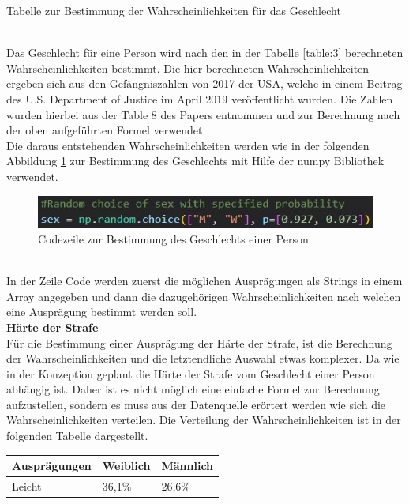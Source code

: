 \begin{onehalfspace}
\begin{table}[!h]
\caption{Tabelle zur Bestimmung der Wahrscheinlichkeiten für das Geschlecht}
\label{table:3}
\end{table}\\
Das Geschlecht für eine Person wird nach den in der Tabelle \ref{table:3} berechneten Wahrscheinlichkeiten bestimmt. Die hier berechneten Wahrscheinlichkeiten ergeben sich aus den Gefängniszahlen von 2017 der USA, welche in einem Beitrag des U.S. Department of Justice im April 2019 veröffentlicht wurden. Die Zahlen wurden hierbei aus der \glqq{}Table 8\grqq{} des Papers entnommen und zur Berechnung nach der oben aufgeführten Formel verwendet.\cite[S. 17]{Bronson2017}\\
Die daraus entstehenden Wahrscheinlichkeiten werden wie in der folgenden Abbildung \ref{fig:GeschlechtscodeS1} zur Bestimmung des Geschlechts mit Hilfe der \glqq{}numpy\grqq{} Bibliothek verwendet.
\begin{figure}[h]
    \centering
    \includegraphics{Diagramme/Sz1_GeschlechtsCode.JPG}
    \caption{Codezeile zur Bestimmung des Geschlechts einer Person}
    \label{fig:GeschlechtscodeS1}
\end{figure}\\
In der Zeile Code werden zuerst die möglichen Ausprägungen als Strings in einem Array angegeben und dann die dazugehörigen Wahrscheinlichkeiten nach welchen eine Ausprägung bestimmt werden soll.\\
\textbf{Härte der Strafe}\\
Für die Bestimmung einer Ausprägung der Härte der Strafe, ist die Berechnung der Wahrscheinlichkeiten und die letztendliche Auswahl etwas komplexer. Da wie in der Konzeption geplant die Härte der Strafe vom Geschlecht einer Person abhängig ist. Daher ist es nicht möglich eine einfache Formel zur Berechnung aufzustellen, sondern es muss aus der Datenquelle erörtert werden wie sich die Wahrscheinlichkeiten verteilen. Die Verteilung der Wahrscheinlichkeiten ist in der folgenden Tabelle dargestellt.\\
\begin{table}[h]
    \centering
    \begin{tabular}{|l|l|l|}
    \hline
    \textbf{Ausprägungen} & \textbf{Weiblich} & \textbf{Männlich} \\ \hline
    Leicht                & 36,1\%            & 26,6\%            \\ \hline

\end{tabular}
\end{table}
\end{onehalfspace}
